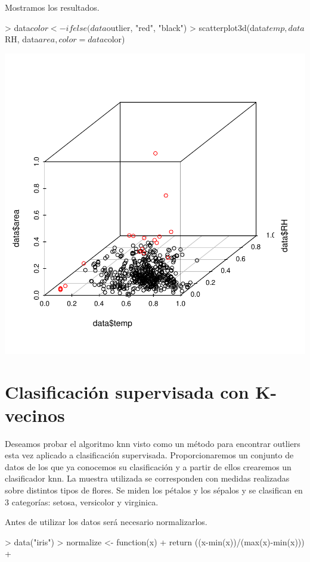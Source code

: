 \documentclass [a4paper] {article}
\begin{document}
Mostramos los resultados.
\begin{center}
\begin{Schunk}
\begin{Sinput}
> data$color <- ifelse(data$outlier, "red", "black")
> scatterplot3d(data$temp, data$RH, data$area,  color = data$color)
\end{Sinput}
\end{Schunk}
\includegraphics{entrega-mahalanobis_plot}
\end{center}

\newpage
\section{Clasificación supervisada con K-vecinos}
Deseamos probar el algoritmo knn visto como un método para encontrar outliers esta vez aplicado a clasificación supervisada.
Proporcionaremos un conjunto de datos de los que ya conocemos su clasificación y a partir de ellos crearemos un clasificador knn.
La muestra utilizada se corresponden con medidas realizadas sobre distintos tipos de flores.
Se miden los pétalos y los sépalos y se clasifican en 3 categorías: setosa, versicolor y virginica.

Antes de utilizar los datos será necesario normalizarlos.
\begin{Schunk}
\begin{Sinput}
> data("iris")
> normalize <- function(x){
+   return ((x-min(x))/(max(x)-min(x)))
+ }
\end{Sinput}
\end{Schunk}
\end{document}
